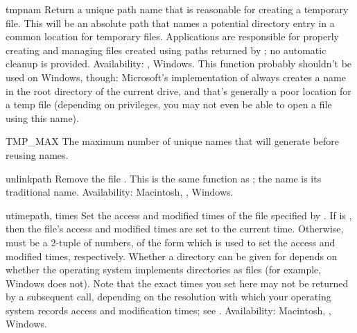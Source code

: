 \begin{funcdesc}{tmpnam}{}
Return a unique path name that is reasonable for creating a temporary
file.  This will be an absolute path that names a potential directory
entry in a common location for temporary files.  Applications are
responsible for properly creating and managing files created using
paths returned by ; no automatic cleanup is
provided.
  Availability: \UNIX, Windows.  This function probably
shouldn't be used on Windows, though: Microsoft's implementation of
 always creates a name in the root directory of the
current drive, and that's generally a poor location for a temp file
(depending on privileges, you may not even be able to open a file
using this name).
\end{funcdesc}

\begin{datadesc}{TMP_MAX}
The maximum number of unique names that  will
generate before reusing names.
\end{datadesc}

\begin{funcdesc}{unlink}{path}
Remove the file .  This is the same function as
; the  name is its traditional
\UNIX{} name.
Availability: Macintosh, \UNIX, Windows.
\end{funcdesc}

\begin{funcdesc}{utime}{path, times}
Set the access and modified times of the file specified by .
If  is , then the file's access and modified
times are set to the current time.  Otherwise,  must be a
2-tuple of numbers, of the form 
which is used to set the access and modified times, respectively.
Whether a directory can be given for  depends on whether the
operating system implements directories as files (for example, Windows
does not).  Note that the exact times you set here may not be returned
by a subsequent  call, depending on the resolution
with which your operating system records access and modification times;
see .
Availability: Macintosh, \UNIX, Windows.
\end{funcdesc}

